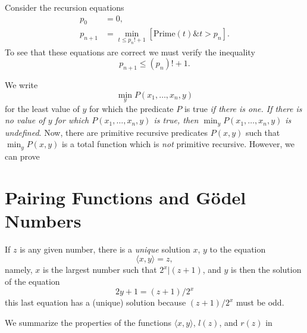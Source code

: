 \documentclass[12pt,a4paper,twoside,openany]{book}
\begin{document}
Consider the recursion equations $$\begin{aligned}p_0&=0,\\p_{n+1}&=\min_{t\le p_n!+1}[\text{Prime}(t)\& t>p_n].\end{aligned}$$ To see that these equations are correct we must verify the inequality
\begin{equation}
    p_{n+1}\le (p_n)!+1.
    \label{eqs.7.1}
\end{equation}

We write $$\min_y P(x_1,\ldots,x_n,y)$$ for the least value of $y$ for which the predicate $P$ is true \textit{if there is one. If there is no value of $y$ for which $P(x_1,\ldots,x_n,y)$ is true, then $\min_yP(x_1,\ldots,x_n,y)$ is undefined}. Now, there are primitive recursive predicates $P(x,y)$ such that $\min_yP(x,y)$ is a total function which is \textit{not} primitive recursive. However, we can prove


\section{Pairing Functions and G\"odel Numbers}

If $z$ is any given number, there is a \textit{unique} solution $x$, $y$ to the equation
\begin{equation}
    \langle x,y\rangle=z,
    \label{8.1}
\end{equation}
namely, $x$ is the largest number such that $2^x|(z+1)$, and $y$ is then the solution of the equation $$2y+1=(z+1)/2^x$$ this last equation has a (unique) solution because $(z+1)/2^x$ must be odd.

We summarize the properties of the functions $\langle x,y\rangle$, $l(z)$, and $r(z)$ in
\end{document}
